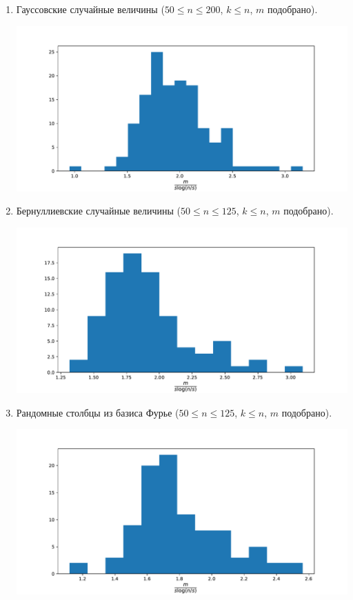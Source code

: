 \documentclass{article}
\begin{document}
\begin{enumerate}
	\item Гауссовские случайные величины ($50 \leq n \leq 200$, $k \leq n$, $m$ подобрано).
	\begin{center}
	    \includegraphics[scale=0.75]{gaussian}
    \end{center}
	
	\item Бернуллиевские случайные величины ($50 \leq n \leq 125$, $k \leq n$, $m$ подобрано).
	\begin{center}
	    \includegraphics[scale=0.75]{bernoulli}
    \end{center}
    
    \item Рандомные столбцы из базиса Фурье ($50 \leq n \leq 125$, $k \leq n$, $m$ подобрано).
    \begin{center}
	    \includegraphics[scale=0.75]{fourier}
    \end{center}
\end{enumerate}
\end{document}
